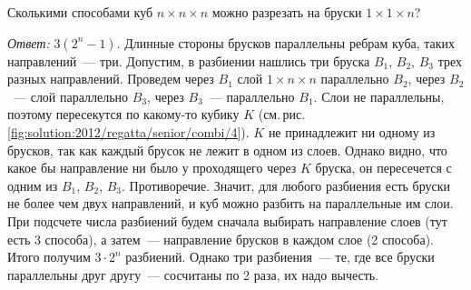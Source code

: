 Сколькими способами куб $n \times n \times n$ можно разрезать на бруски
$1 \times 1 \times n$?

%
\label{solution:2012/regatta/senior/combi/4}%
\emph{Ответ:} $3(2^n - 1)$.
Длинные стороны брусков параллельны ребрам куба, таких направлений~--- три.
Допустим, в разбиении нашлись три бруска $B_1$, $B_2$, $B_3$ трех разных
направлений.
Проведем через $B_1$ слой $1 \times n \times n$ параллельно $B_2$,
через $B_2$~--- слой параллельно $B_3$, через $B_3$~--- параллельно $B_1$.
Слои не параллельны, поэтому пересекутся по какому-то кубику $K$
(см.\,рис.\,\ref{fig:solution:2012/regatta/senior/combi/4}).
$K$ не принадлежит ни одному из брусков, так как каждый брусок не лежит в
одном из слоев.
Однако видно, что какое бы направление ни было у проходящего через $K$ бруска,
он пересечется с одним из $B_1$, $B_2$, $B_3$.
Противоречие.
Значит, для любого разбиения есть бруски не более чем двух направлений, и куб
можно разбить на параллельные им слои.
При подсчете числа разбиений будем сначала выбирать направление слоев
(тут есть 3 способа), а затем~--- направление брусков в каждом слое
(2 способа).
Итого получим $3 \cdot 2^n$ разбиений.
Однако три разбиения~--- те, где все бруски параллельны друг другу~---
сосчитаны по 2 раза, их надо вычесть.

